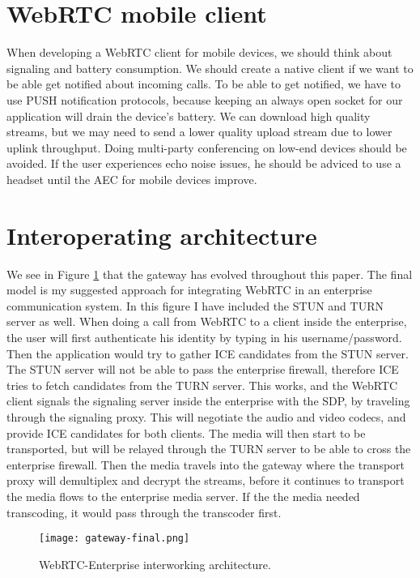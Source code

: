 \section{WebRTC mobile client}
When developing a WebRTC client for mobile devices, we should think about signaling and battery consumption. We should create a native client if we want to be able get notified about incoming calls. To be able to get notified, we have to use PUSH notification protocols, because keeping an always open socket for our application will drain the device's battery. We can download high quality streams, but we may need to send a lower quality upload stream due to lower uplink throughput. Doing multi-party conferencing on low-end devices should be avoided. If the user experiences echo noise issues, he should be adviced to use a headset until the AEC for mobile devices improve.

\section{Interoperating architecture}

We see in Figure \ref{fig:gateway-final} that the gateway has evolved throughout this paper. The final model is my suggested approach for integrating WebRTC in an enterprise communication system. In this figure I have included the STUN and TURN server as well. When doing a call from WebRTC to a client inside the enterprise, the user will first authenticate his identity by typing in his username/password. Then the application would try to gather ICE candidates from the STUN server. The STUN server will not be able to pass the enterprise firewall, therefore ICE tries to fetch candidates from the TURN server. This works, and the WebRTC client signals the signaling server inside the enterprise with the SDP, by traveling through the signaling proxy. This will negotiate the audio and video codecs, and provide ICE candidates for both clients. The media will then start to be transported, but will be relayed through the TURN server to be able to cross the enterprise firewall. Then the media travels into the gateway where the transport proxy will demultiplex and decrypt the streams, before it continues to transport the media flows to the enterprise media server. If the the media needed transcoding, it would pass through the transcoder first.
\\
\begin{figure}[here]
\centerline{\texttt{[image: gateway-final.png]}}
\caption{WebRTC-Enterprise interworking architecture.}
\label{fig:gateway-final}
\end{figure}


